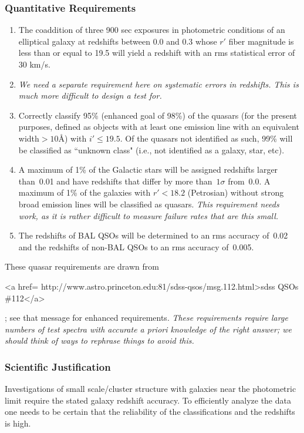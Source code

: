 \subsubsection{Quantitative Requirements}
\begin{enumerate} 
\item The coaddition of three 900 sec exposures in photometric
conditions of an elliptical galaxy at redshifts between 0.0 and 0.3
whose $r'$ fiber magnitude is less than or equal to 19.5 will yield a
redshift with an rms statistical error of 30 km/s. 
\item {\it We need a separate requirement here on systematic errors in
redshifts.  This is much more difficult to design a test for.}
\item Correctly classify 95\% (enhanced goal of 98\%) of the
quasars (for the present purposes, defined as objects with at least one
emission line with an equivalent width${}> 10$\AA) with $i' \le 19.5$. 
Of the quasars not identified as
such, 99\% will be classified as ``unknown class" (i.e., not identified
as a galaxy, star, etc).

\item A maximum of 1\% of the Galactic stars will be assigned redshifts larger
   than~0.01 and have redshifts that differ by more than~$1\sigma$ from~0.0.
   A maximum of 1\% of the galaxies with $r' < 18.2$ (Petrosian)
without strong broad emission lines will be classified as quasars.  {\it
This requirement needs work, as it is rather difficult to measure
failure rates that are this small.}
\item The redshifts of BAL QSOs will be determined to an rms accuracy of~0.02 and the
   redshifts of non-BAL QSOs to an rms accuracy of~0.005. 
\end{enumerate}
These quasar requirements are drawn from 
\begin{rawhtml}
<a href= http://www.astro.princeton.edu:81/sdss-qsos/msg.112.html>sdss QSOs
\#112</a>\end{rawhtml}; see
that 
message for enhanced requirements.  {\it These requirements require large
numbers of test spectra with accurate a priori knowledge of the right
answer; we should think of ways to rephrase things to avoid this.}

\subsubsection{Scientific Justification}

Investigations of small scale/cluster structure with galaxies near the
photometric limit require the stated galaxy redshift accuracy.  To efficiently
analyze the data one needs to be certain that the reliability of the
classifications and the redshifts is high. 

